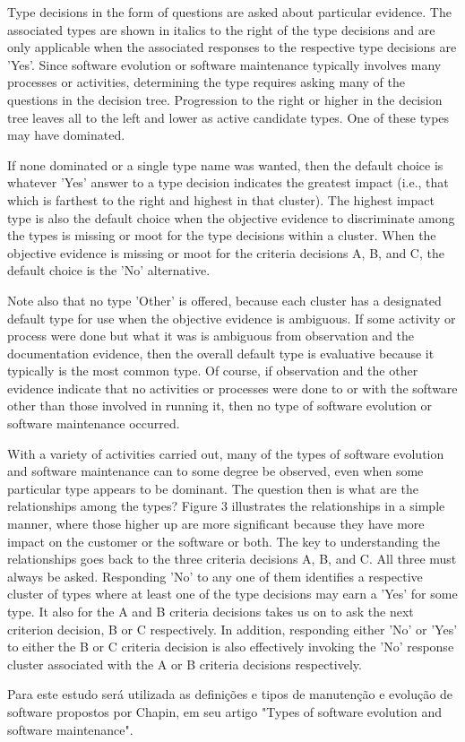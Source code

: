 
Type decisions in the form of questions are asked about particular evidence. The associated types 
are shown in italics to the right of the type decisions and are only applicable when the associated 
responses to the respective type decisions are 'Yes'. Since software evolution or software maintenance 
typically involves many processes or activities, determining the type requires asking many of the 
questions in the decision tree. Progression to the right or higher in the decision tree leaves 
all to the left and lower as active candidate types. One of these types may have dominated.

If none dominated or a single type name was wanted, then the default choice is whatever 'Yes' 
answer to a type decision indicates the greatest impact (i.e., that which is farthest to the right 
and highest in that cluster). The highest impact type is also the default choice when the objective 
evidence to discriminate among the types is missing or moot for the type decisions within a cluster. 
When the objective evidence is missing or moot for the criteria decisions A, B, and C, 
the default choice is the 'No' alternative.

Note also that no type 'Other' is offered, because each cluster has a designated default type for use
when the objective evidence is ambiguous. If some activity or process were done but what it was is
ambiguous from observation and the documentation evidence, then the overall default type is evaluative
because it typically is the most common type. Of course, if observation and the other evidence
indicate that no activities or processes were done to or with the software other than those involved in
running it, then no type of software evolution or software maintenance occurred.

With a variety of activities carried out, many of the types of software evolution and software
maintenance can to some degree be observed, even when some particular type appears to be dominant.
The question then is what are the relationships among the types? Figure 3 illustrates the relationships
in a simple manner, where those higher up are more significant because they have more impact on the
customer or the software or both. The key to understanding the relationships goes back to the three
criteria decisions A, B, and C. All three must always be asked. Responding 'No' to any one of them
identifies a respective cluster of types where at least one of the type decisions may earn a 'Yes' for
some type. It also for the A and B criteria decisions takes us on to ask the next criterion decision, B or
C respectively. In addition, responding either 'No' or 'Yes' to either the B or C criteria decision is also
effectively invoking the 'No' response cluster associated with the A or B criteria decisions respectively.


Para este estudo será utilizada as definições e tipos de manutenção e evolução de software 
propostos por Chapin, em seu artigo "Types of software evolution and software maintenance".